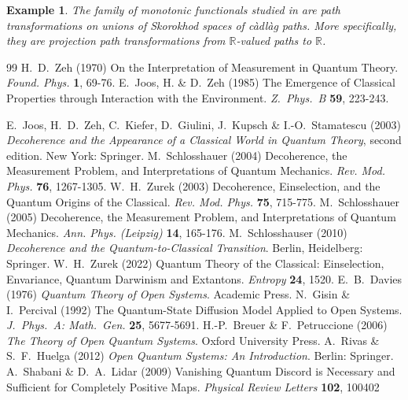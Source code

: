 \documentclass[12pt,a4paper]{article}
\newtheorem{ex}[thm]{Example}
\newcommand{\cadlag}{{c\`adl\`ag }}
\def\R{\mathbb{R}}
\begin{document}
\begin{ex}
\emph{The family of monotonic functionals studied in \cite{Menguturk 2025} are path transformations on unions of Skorokhod spaces of \cadlag paths. More specifically, they are projection path transformations from $\R$-valued paths to $\R$.}
\end{ex}


\begin{thebibliography}{99}
%
 H.~D.~Zeh (1970) On the Interpretation of Measurement in Quantum Theory. \textit{Found. Phys.} {\bf 1}, 69-76.
%
 E.~Joos, H. \& D.~Zeh (1985) The Emergence of Classical Properties through Interaction with the Environment. \textit{Z.~Phys.~B} {\bf 59}, 223-243.

%
 E.~Joos, H.~D.~Zeh, C.~Kiefer, D.~Giulini, J.~Kupsch \& I.-O.~Stamatescu (2003) \textit{Decoherence and the Appearance of a Classical
World in Quantum Theory}, second edition. New York: Springer.
%
 M.~Schlosshauer (2004) Decoherence, the Measurement Problem, and Interpretations of Quantum Mechanics. \textit{Rev. Mod. Phys.} {\bf 76}, 1267-1305. 
%
 W.~H.~Zurek (2003) Decoherence, Einselection, and the Quantum Origins of the Classical. \textit{Rev. Mod. Phys.} {\bf 75}, 715-775.
%
 M.~Schlosshauer (2005) Decoherence, the Measurement Problem, and Interpretations of Quantum Mechanics. \textit{Ann. Phys. (Leipzig)} {\bf 14}, 165-176.
%
 M.~Schlosshauser (2010)  \textit{Decoherence and the Quantum-to-Classical Transition}. Berlin, Heidelberg: Springer.
%
 W.~H.~Zurek (2022) Quantum Theory of the Classical: Einselection, Envariance, Quantum Darwinism and Extantons. \textit{Entropy} {\bf 24}, 1520.
%
 E.~B.~Davies (1976) \textit{Quantum Theory of Open Systems}. Academic Press.
%
 N.~Gisin \& I.~Percival (1992) The Quantum-State Diffusion Model Applied to Open Systems. \textit{J.~Phys.~A: Math.~Gen.} {\bf 25}, 5677-5691.
%
 H.-P.~Breuer \& F.~Petruccione (2006) \textit{The Theory of Open Quantum Systems}. Oxford University Press.
%
 A.~Rivas \& S.~F.~Huelga (2012) \textit{Open Quantum Systems: An Introduction}. Berlin: Springer.
%
 A.~Shabani \& D.~A.~Lidar (2009) Vanishing Quantum Discord is Necessary and Sufficient for Completely Positive Maps. \textit{Physical Review Letters} {\bf 102}, 100402

\end{thebibliography}
\end{document}

